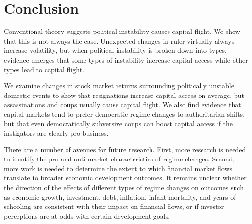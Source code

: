 \documentclass[12pt,final,fleqn]{article}
\theoremstyle{plain}
\begin{document}
\section{Conclusion}

Conventional theory suggests political instability causes capital flight. We show that this is not always the case. Unexpected changes in ruler virtually always increase volatility, but when political instability is broken down into types, evidence emerges that some types of instability increase capital access while other types lead to capital flight. 


We examine changes in stock market returns surrounding politically unstable domestic events to show that resignations increase capital access on average, but assassinations and coups usually cause capital flight. We also find evidence that capital markets tend to prefer democratic regime changes to authoritarian shifts, but that even democratically subversive coups can boost capital access if the instigators are clearly pro-business. 

There are a number of avenues for future research. First, more research is needed to identify the pro and anti market characteristics of regime changes. Second, more work is needed to determine the extent to which financial market flows translate to broader economic development outcomes. It remains unclear whether the direction of the effects of different types of regime changes on outcomes such as economic growth, investment, debt, inflation, infant mortality, and years of schooling are consistent with their impact on financial flows, or if investor perceptions are at odds with certain development goals. 



\end{document}
